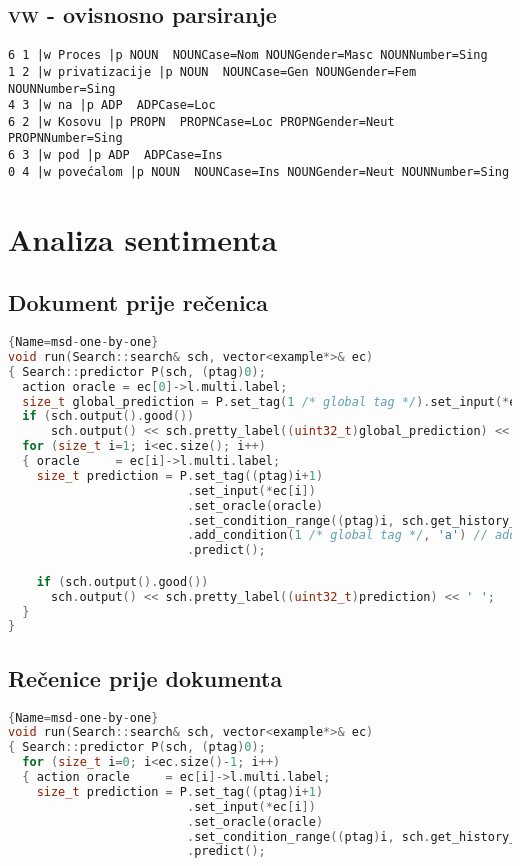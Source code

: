 \begin{appendix}
\section{\textsc{vw} - ovisnosno parsiranje}
\begin{lstlisting}[basicstyle=\tiny\ttfamily]
6 1 |w Proces |p NOUN  NOUNCase=Nom NOUNGender=Masc NOUNNumber=Sing
1 2 |w privatizacije |p NOUN  NOUNCase=Gen NOUNGender=Fem NOUNNumber=Sing
4 3 |w na |p ADP  ADPCase=Loc
6 2 |w Kosovu |p PROPN  PROPNCase=Loc PROPNGender=Neut PROPNNumber=Sing
6 3 |w pod |p ADP  ADPCase=Ins
0 4 |w povećalom |p NOUN  NOUNCase=Ins NOUNGender=Neut NOUNNumber=Sing
\end{lstlisting}

\chapter{Analiza sentimenta}\label{appendix:sentiment}
\section{Dokument prije rečenica}
\begin{lstlisting}[language=C++,
                   basicstyle=\tiny\ttfamily]{Name=msd-one-by-one}
void run(Search::search& sch, vector<example*>& ec)
{ Search::predictor P(sch, (ptag)0);
  action oracle = ec[0]->l.multi.label;
  size_t global_prediction = P.set_tag(1 /* global tag */).set_input(*ec[0]).set_oracle(oracle).predict();
  if (sch.output().good())
      sch.output() << sch.pretty_label((uint32_t)global_prediction) << ' ';
  for (size_t i=1; i<ec.size(); i++)
  { oracle     = ec[i]->l.multi.label;
    size_t prediction = P.set_tag((ptag)i+1)
                         .set_input(*ec[i])
                         .set_oracle(oracle)
                         .set_condition_range((ptag)i, sch.get_history_length(), 'p')
                         .add_condition(1 /* global tag */, 'a') // adds the global as condition on each sequence element
                         .predict();

    if (sch.output().good())
      sch.output() << sch.pretty_label((uint32_t)prediction) << ' ';
  }
}
\end{lstlisting}
\section{Rečenice prije dokumenta}
\begin{lstlisting}[language=C++,
                   basicstyle=\tiny\ttfamily]{Name=msd-one-by-one}
void run(Search::search& sch, vector<example*>& ec)
{ Search::predictor P(sch, (ptag)0);
  for (size_t i=0; i<ec.size()-1; i++)
  { action oracle     = ec[i]->l.multi.label;
    size_t prediction = P.set_tag((ptag)i+1)
                         .set_input(*ec[i])
                         .set_oracle(oracle)
                         .set_condition_range((ptag)i, sch.get_history_length(), 'p')
                         .predict();


\end{lstlisting}
\end{appendix}
